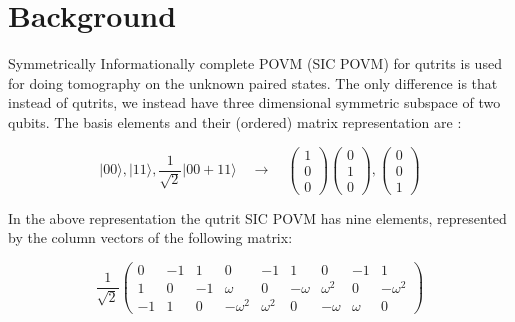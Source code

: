 \documentclass{article}
\title{\examtitle}
\author{}
\date{}
\begin{document}
\maketitle

\begin{center}
\begin{tabular}{ll}
\end{tabular}
\end{center}

\section{Background}

Symmetrically Informationally complete POVM (SIC POVM) for qutrits is used for doing tomography on the unknown paired states. The only difference is that instead of qutrits, we instead have three dimensional symmetric subspace of two qubits. The basis elements and their (ordered) matrix representation are : 

$$| 00 \rangle,| 11 \rangle,\frac{1}{\sqrt{2}}| 00 + 11\rangle \quad  \longrightarrow   \quad   \begin{pmatrix}
1 \\
0 \\
0
\end{pmatrix} \begin{pmatrix}
0 \\
1 \\
0
\end{pmatrix}, \begin{pmatrix}
0 \\
0 \\
1
\end{pmatrix} $$ 

In the above representation the qutrit SIC POVM has nine elements, represented by the column vectors of the following matrix:

\begin{equation}
\frac{1}{\sqrt{2}}\left(\begin{array}{ccccccccc}
0 & -1 & 1 & 0 & -1 & 1 & 0 & -1 & 1 \\
1 & 0 & -1 & \omega & 0 & -\omega & \omega^2 & 0 & -\omega^2 \\
-1 & 1 & 0 & -\omega^2 & \omega^2 & 0 & -\omega & \omega & 0
\end{array}\right)
\end{equation}
\end{document}
